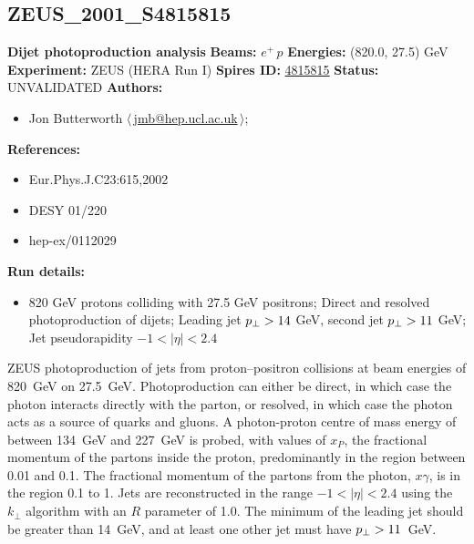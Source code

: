 \clearpage


\clearpage

\subsection[ZEUS\_2001\_S4815815]{ZEUS\_2001\_S4815815\,\cite{Chekanov:2001bw}}
\textbf{Dijet photoproduction analysis}\newline
\textbf{Beams:} $e^+$\,$p$ \newline
\textbf{Energies:} (820.0, 27.5) GeV \newline
\textbf{Experiment:} ZEUS (HERA Run I) \newline
\textbf{Spires ID:} \href{http://www.slac.stanford.edu/spires/find/hep/www?rawcmd=key+4815815}{4815815}\newline
\textbf{Status:} UNVALIDATED\newline
\textbf{Authors:}
\begin{itemize}
  \item Jon Butterworth $\langle\,$\href{mailto:jmb@hep.ucl.ac.uk}{jmb@hep.ucl.ac.uk}$\,\rangle$;
\end{itemize}
\textbf{References:}
\begin{itemize}
  \item Eur.Phys.J.C23:615,2002
  \item DESY 01/220
  \item hep-ex/0112029
\end{itemize}
\textbf{Run details:}
\begin{itemize}

  \item 820 GeV protons colliding with 27.5 GeV positrons; Direct and resolved photoproduction of dijets; Leading jet $p_\perp > 14$ GeV, second jet $p_\perp > 11$ GeV; Jet pseudorapidity $-1 < |\eta| < 2.4$\end{itemize}

\noindent ZEUS photoproduction of jets from proton--positron collisions at beam energies of 820~GeV on 27.5~GeV. Photoproduction can either be direct, in which case the photon interacts directly with the parton, or resolved, in which case the photon acts as a source of quarks and gluons. A photon-proton centre of mass energy of between 134~GeV and 227~GeV is probed, with values of $x_P$, the fractional momentum of the partons inside the proton, predominantly in the region between 0.01 and 0.1. The fractional momentum of the partons from the photon, $x\gamma$, is in the region 0.1 to 1. Jets are reconstructed in the range $-1 < |\eta| < 2.4$ using the $k_\perp$ algorithm with an $R$ parameter of 1.0. The minimum \pT of the leading jet should be greater than 14~GeV, and at least one other jet must have $p_\perp > 11$~GeV.

